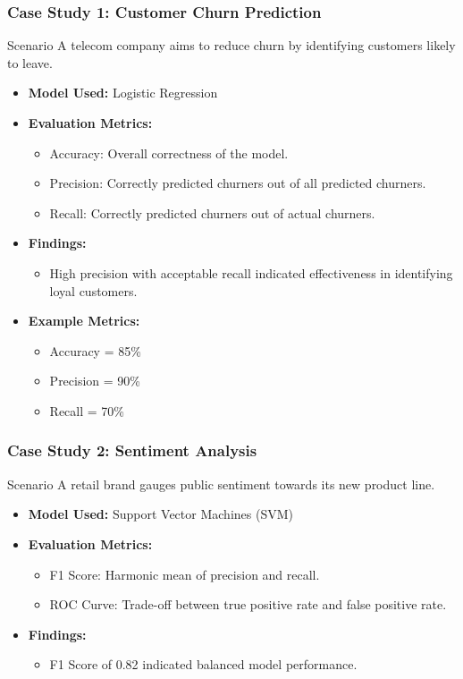 \documentclass[aspectratio=169]{beamer}
\begin{document}
\begin{frame}[fragile]
    \frametitle{Case Study 1: Customer Churn Prediction}
    \begin{block}{Scenario}
        A telecom company aims to reduce churn by identifying customers likely to leave.
    \end{block}
    \begin{itemize}
        \item \textbf{Model Used:} Logistic Regression
        \item \textbf{Evaluation Metrics:}
        \begin{itemize}
            \item Accuracy: Overall correctness of the model.
            \item Precision: Correctly predicted churners out of all predicted churners.
            \item Recall: Correctly predicted churners out of actual churners.
        \end{itemize}
        \item \textbf{Findings:} 
        \begin{itemize}
            \item High precision with acceptable recall indicated effectiveness in identifying loyal customers.
        \end{itemize}
        \item \textbf{Example Metrics:}
        \begin{itemize}
            \item Accuracy = 85\%
            \item Precision = 90\%
            \item Recall = 70\%
        \end{itemize}
    \end{itemize}
\end{frame}

\begin{frame}[fragile]
    \frametitle{Case Study 2: Sentiment Analysis}
    \begin{block}{Scenario}
        A retail brand gauges public sentiment towards its new product line.
    \end{block}
    \begin{itemize}
        \item \textbf{Model Used:} Support Vector Machines (SVM)
        \item \textbf{Evaluation Metrics:}
        \begin{itemize}
            \item F1 Score: Harmonic mean of precision and recall.
            \item ROC Curve: Trade-off between true positive rate and false positive rate.
        \end{itemize}
        \item \textbf{Findings:}
        \begin{itemize}
            \item F1 Score of 0.82 indicated balanced model performance.
        \end{itemize}
    \end{itemize}
\end{frame}
\end{document}
